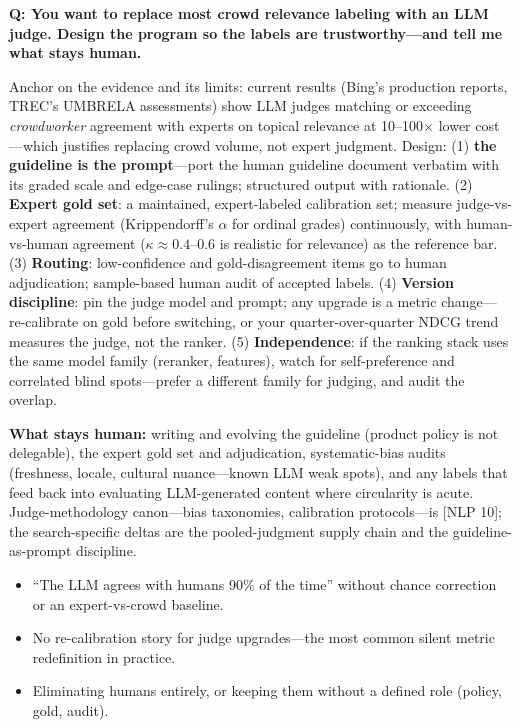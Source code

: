\begin{interviewq}
\textbf{Q: You want to replace most crowd relevance labeling with an LLM judge. Design the program so the labels are trustworthy---and tell me what stays human.}

 \quad {} \quad \badgefreq{\freqmed}

\stronganswer

Anchor on the evidence and its limits: current results (Bing's production reports, TREC's UMBRELA assessments) show LLM judges matching or exceeding \textit{crowdworker} agreement with experts on topical relevance at 10--100$\times$ lower cost---which justifies replacing crowd volume, not expert judgment. Design: (1) \textbf{the guideline is the prompt}---port the human guideline document verbatim with its graded scale and edge-case rulings; structured output with rationale. (2) \textbf{Expert gold set}: a maintained, expert-labeled calibration set; measure judge-vs-expert agreement (Krippendorff's $\alpha$ for ordinal grades) continuously, with human-vs-human agreement ($\kappa \approx 0.4$--$0.6$ is realistic for relevance) as the reference bar. (3) \textbf{Routing}: low-confidence and gold-disagreement items go to human adjudication; sample-based human audit of accepted labels. (4) \textbf{Version discipline}: pin the judge model and prompt; any upgrade is a metric change---re-calibrate on gold before switching, or your quarter-over-quarter NDCG trend measures the judge, not the ranker. (5) \textbf{Independence}: if the ranking stack uses the same model family (reranker, features), watch for self-preference and correlated blind spots---prefer a different family for judging, and audit the overlap.

\textbf{What stays human:} writing and evolving the guideline (product policy is not delegable), the expert gold set and adjudication, systematic-bias audits (freshness, locale, cultural nuance---known LLM weak spots), and any labels that feed back into evaluating LLM-generated content where circularity is acute. Judge-methodology canon---bias taxonomies, calibration protocols---is [NLP 10]; the search-specific deltas are the pooled-judgment supply chain and the guideline-as-prompt discipline.

\redflags
\begin{itemize}
    \item ``The LLM agrees with humans 90\% of the time'' without chance correction or an expert-vs-crowd baseline.
    \item No re-calibration story for judge upgrades---the most common silent metric redefinition in practice.
    \item Eliminating humans entirely, or keeping them without a defined role (policy, gold, audit).
\end{itemize}


\end{interviewq}
